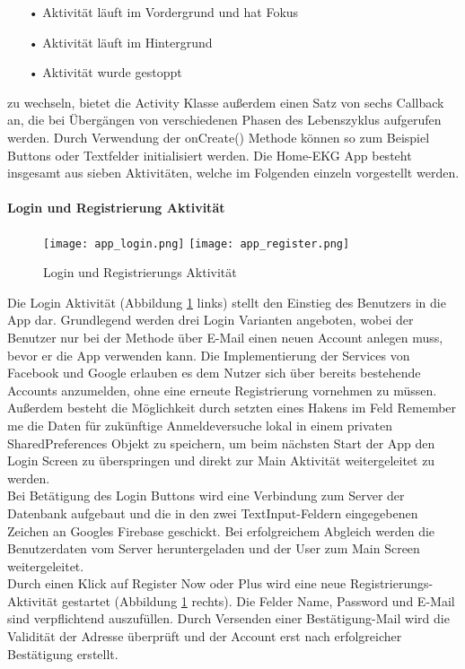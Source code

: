 \begin{itemize}
\item[•] Aktivität läuft im Vordergrund und hat Fokus
\item[•] Aktivität läuft im Hintergrund
\item[•] Aktivität wurde gestoppt
\end{itemize}

zu wechseln, bietet die Activity Klasse außerdem einen Satz von sechs Callback an, die bei Übergängen von verschiedenen Phasen des Lebenszyklus aufgerufen werden. Durch Verwendung der onCreate() Methode können so zum Beispiel Buttons oder Textfelder initialisiert werden.
Die Home-EKG App besteht insgesamt aus sieben Aktivitäten, welche im Folgenden einzeln vorgestellt werden.

\paragraph{Login und Registrierung Aktivität}
\begin{figure} [!h]
	\begin{center}
		\texttt{[image: app\_login.png]}
		\hspace{1.5 cm}
		\texttt{[image: app\_register.png]}
	\end{center}
	\caption{Login und Registrierungs Aktivität}
	\label{app_login_reg}
\end{figure}

Die Login Aktivität (Abbildung \ref{app_login_reg} links) stellt den Einstieg des Benutzers in die App dar. Grundlegend werden drei Login Varianten angeboten, wobei der Benutzer nur bei der Methode über E-Mail einen neuen Account anlegen muss, bevor er die App verwenden kann. Die Implementierung der Services von Facebook und Google erlauben es dem Nutzer sich über bereits bestehende Accounts anzumelden, ohne eine erneute Registrierung vornehmen zu müssen. \\
Außerdem besteht die Möglichkeit durch setzten eines Hakens im Feld Remember me die Daten für zukünftige Anmeldeversuche lokal in einem privaten SharedPreferences Objekt zu speichern, um beim nächsten Start der App den Login Screen zu überspringen und direkt zur Main Aktivität weitergeleitet zu werden. \\
Bei Betätigung des Login Buttons wird eine Verbindung zum Server der Datenbank aufgebaut und die in den zwei TextInput-Feldern eingegebenen Zeichen an Googles Firebase geschickt. Bei erfolgreichem Abgleich werden die Benutzerdaten vom Server heruntergeladen und der User zum Main Screen weitergeleitet. \\
Durch einen Klick auf Register Now oder Plus wird eine neue Registrierungs-Aktivität gestartet (Abbildung \ref{app_login_reg} rechts). Die Felder Name, Password und E-Mail sind verpflichtend auszufüllen. Durch Versenden einer Bestätigung-Mail wird die Validität der Adresse überprüft und der Account erst nach erfolgreicher Bestätigung erstellt.

